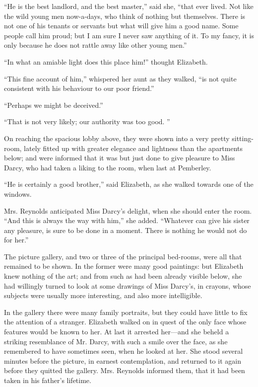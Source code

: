 \documentclass[10pt]{book}
\begin{document}
   “He is the best landlord, and the best master,” said she, “that ever
lived. Not like the wild young men now-a-days, who think of nothing but
themselves. There is not one of his tenants or servants but what will
give him a good name. Some people call him proud; but I am sure I never
saw anything of it. To my fancy, it is only because he does not rattle
away like other young men.”
  

   “In what an amiable light does this place him!” thought Elizabeth.
  

   “This fine account of him,” whispered her aunt as they walked, “is not
quite consistent with his behaviour to our poor friend.”
  

   “Perhaps we might be deceived.”
  

   “That is not very likely; our authority was too good.
   ”
  

   On reaching the spacious lobby above, they were shown into a very pretty
sitting-room, lately fitted up with greater elegance and lightness than
the apartments below; and were informed that it was but just done to
give pleasure to Miss Darcy, who had taken a liking to the room, when
last at Pemberley.
  

   “He is certainly a good brother,” said Elizabeth, as she walked towards
one of the windows.
  

   Mrs. Reynolds anticipated Miss Darcy’s delight, when she should enter
the room. “And this is always the way with him,” she added. “Whatever
can give his sister any pleasure, is sure to be done in a moment. There
is nothing he would not do for her.”
  

   The picture gallery, and two or three of the principal bed-rooms, were
all that remained to be shown. In the former were many good paintings:
but Elizabeth knew nothing of the art; and from such as had been already
visible below, she had willingly turned to look at some drawings of Miss
Darcy’s, in crayons, whose subjects were usually more interesting, and
also more intelligible.
  

   In the gallery there were many family portraits, but they could have
little to fix the attention of a stranger. Elizabeth walked on in quest
of the only face whose features would be known to her. At last it
arrested her—and she beheld a striking resemblance of Mr. Darcy, with
such a smile over the face, as she remembered to have sometimes seen,
when he looked at her. She stood several minutes before the picture, in
earnest contemplation, and returned to it again before they quitted the
gallery. Mrs. Reynolds informed them, that it had been taken in his
father’s lifetime.
  
\end{document}
